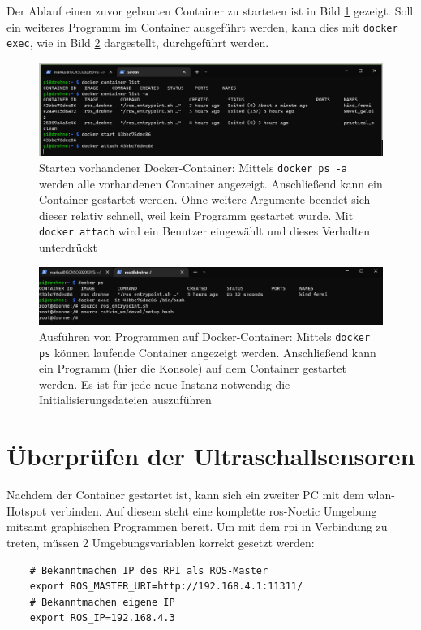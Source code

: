 Der Ablauf einen zuvor gebauten Container zu starteten ist in Bild \ref{fig:avoid_container_start} gezeigt. Soll ein weiteres Programm im Container ausgeführt werden, kann dies mit \texttt{docker exec}, wie in Bild \ref{fig:avoid_container_exec} dargestellt, durchgeführt werden.

\begin{figure}[!ht]
    \centering
    \includegraphics[width=0.6\linewidth]{images/avoid_container_start.png}
    \caption[Starten vorhandener Docker-Container]{Starten vorhandener Docker-Container: Mittels \texttt{docker ps -a} werden alle vorhandenen Container angezeigt. Anschließend kann ein Container gestartet werden. Ohne weitere Argumente beendet sich dieser relativ schnell, weil kein Programm gestartet wurde. Mit \texttt{docker attach} wird ein Benutzer eingewählt und dieses Verhalten unterdrückt}
    \label{fig:avoid_container_start}
\end{figure}
\begin{figure}[!ht]
    \centering
    \includegraphics[width=0.6\linewidth]{images/avoid_container_exec.png}
    \caption[Ausführen von Programmen auf Docker-Container]{Ausführen von Programmen auf Docker-Container: Mittels \texttt{docker ps} können laufende Container angezeigt werden. Anschließend kann ein Programm (hier die Konsole) auf dem Container gestartet werden. Es ist für jede neue Instanz notwendig die Initialisierungsdateien auszuführen}
    \label{fig:avoid_container_exec}
\end{figure}

\section{Überprüfen der Ultraschallsensoren}
Nachdem der Container gestartet ist, kann sich ein zweiter PC mit dem \gls{wlan}-Hotspot verbinden. Auf diesem steht eine komplette \acrshort{ros}-Noetic Umgebung mitsamt graphischen Programmen bereit. Um mit dem \gls{rpi} in Verbindung zu treten, müssen 2 Umgebungsvariablen korrekt gesetzt werden:
\begin{verbatim}
    # Bekanntmachen IP des RPI als ROS-Master
    export ROS_MASTER_URI=http://192.168.4.1:11311/
    # Bekanntmachen eigene IP
    export ROS_IP=192.168.4.3
\end{verbatim}

